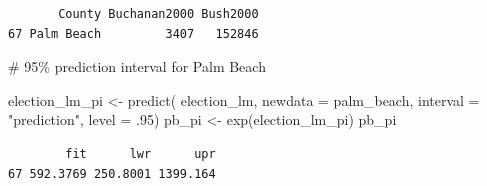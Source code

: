 \documentclass[
  letterpaper,
  DIV=11,
  numbers=noendperiod]{scrartcl}
\newenvironment{Shaded}{\begin{snugshade}}{\end{snugshade}}
\newcommand{\AttributeTok}[1]{\textcolor[rgb]{0.40,0.45,0.13}{#1}}
\newcommand{\CommentTok}[1]{\textcolor[rgb]{0.37,0.37,0.37}{#1}}
\newcommand{\DecValTok}[1]{\textcolor[rgb]{0.68,0.00,0.00}{#1}}
\newcommand{\FunctionTok}[1]{\textcolor[rgb]{0.28,0.35,0.67}{#1}}
\newcommand{\NormalTok}[1]{\textcolor[rgb]{0.00,0.23,0.31}{#1}}
\newcommand{\OtherTok}[1]{\textcolor[rgb]{0.00,0.23,0.31}{#1}}
\newcommand{\StringTok}[1]{\textcolor[rgb]{0.13,0.47,0.30}{#1}}
\begin{document}
\begin{verbatim}
       County Buchanan2000 Bush2000
67 Palm Beach         3407   152846
\end{verbatim}

\begin{Shaded}
\begin{Highlighting}[]
\CommentTok{\# 95\% prediction interval for Palm Beach }

\NormalTok{election\_lm\_pi }\OtherTok{\textless{}{-}} \FunctionTok{predict}\NormalTok{(}
\NormalTok{  election\_lm, }
  \AttributeTok{newdata =}\NormalTok{ palm\_beach, }
  \AttributeTok{interval =} \StringTok{"prediction"}\NormalTok{, }
  \AttributeTok{level =}\NormalTok{ .}\DecValTok{95}\NormalTok{)}
\NormalTok{pb\_pi }\OtherTok{\textless{}{-}} \FunctionTok{exp}\NormalTok{(election\_lm\_pi)}
\NormalTok{pb\_pi}
\end{Highlighting}
\end{Shaded}

\begin{verbatim}
        fit      lwr      upr
67 592.3769 250.8001 1399.164
\end{verbatim}
\end{document}
